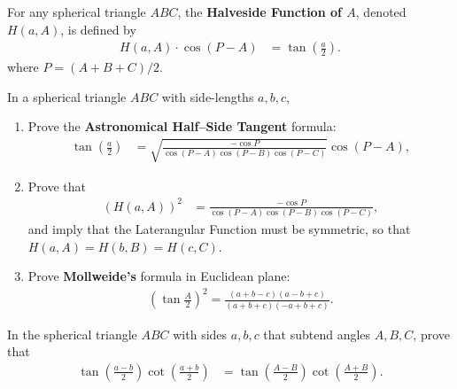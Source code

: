 \begin{tcolorbox}[title={The Global Half--Side Identities}]
\begin{definition} 
    For any spherical triangle $ABC$, the \textbf{Halveside Function of $A$}, denoted $H(a,A)$, is defined by
        \begin{align*}
            H(a,A)\cdot\cos(P-A)&=\tan \left({\frac {a}{2}}\right).
        \end{align*}
    where $P=(A+B+C)/2$.
    \end{definition}
    \begin{question}
    In a spherical triangle $ABC$ with side-lengths $a,b,c$,
            \begin{enumerate}
            \item  Prove the \textbf{Astronomical Half--Side Tangent} formula:
            \begin{align*}
                \tan \left({\frac {a}{2}}\right)&={\sqrt {\frac {-\cos P}{\cos(P-A)\cos(P-B)\cos(P-C)}}}\cos(P-A),
            \end{align*}
            \item Prove that
            \begin{align*}
                \left(H(a,A)\right)^2 &= \frac {-\cos P}{\cos(P-A)\cos(P-B)\cos(P-C)},
            \end{align*}
            and imply that the Laterangular Function must be symmetric, so that $H(a,A) = H(b,B) = H(c,C)$.
            \item Prove \textbf{Mollweide's} formula in Euclidean plane:
            \begin{align*}
                \displaystyle \left(\tan \frac{A}{2}\right )^{2}=\frac {(a+b-c)(a-b+c)}{(a+b+c)(-a+b+c)}.
            \end{align*}
            \end{enumerate}
    \end{question}
    \begin{question}[name={Spherical Half--Side Tangent--Cotangent Formulae}]
        In the spherical triangle $ABC$ with sides $a,b,c$ that subtend angles $A,B,C$, prove that
        \begin{align*}
            \tan \left(\frac{a-b}{2}\right) \cot \left(\frac{a+b}{2}\right) &=\tan \left(\frac{A-B}{2}\right) \cot \left(\frac{A+B}{2}\right).
        \end{align*}
    \end{question}   


\end{tcolorbox}
